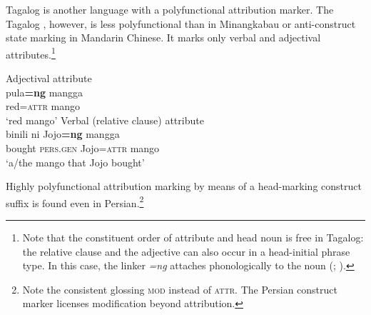 Tagalog is another language with a polyfunctional attribution marker. The Tagalog , however, is less polyfunctional than  in Minangkabau or anti\hyp{}construct state marking in Mandarin Chinese. It marks only verbal and adjectival attributes.\footnote{Note that the constituent order of attribute and head noun is free in Tagalog: the relative clause and the adjective can also occur in a head-initial phrase type. In this case, the linker \textit{=ng} attaches phonologically to the noun (\citealt[1]{gil2005}; \citealt[160, 162]{himmelmann1997}).}
\begin{exe}
\ex 
{} \label{multi tagalog}
\begin{xlist}
\ex \rm{Adjectival attribute}\\
\gll	pula\textbf{=ng} mangga\\
	red{=\textsc{attr}} mango\\
\glt	‘red mango’
\ex \rm{Verbal (relative clause) attribute}\\
\gll	binili ni Jojo\textbf{=ng} mangga\\
	bought \textsc{pers.gen} Jojo{=\textsc{attr}} mango\\
\glt	‘a/the mango that Jojo bought’
\end{xlist}
\end{exe}
Highly polyfunctional attribution marking by means of a head-marking construct suffix is found even in Persian.\footnote{Note the consistent glossing \textsc{mod} instead of \textsc{attr}. The Persian construct marker licenses modification beyond attribution.}
